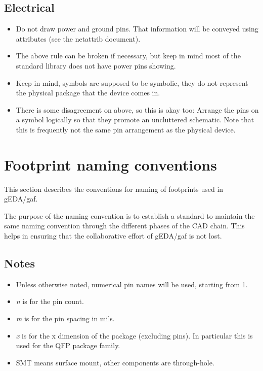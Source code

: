\documentclass{article}
\begin{document}
\subsection{Electrical}

\begin{itemize}
\item Do not draw power and ground pins.  That information will be
      conveyed using attributes (see the netattrib document).
\item The above rule can be broken if necessary, but keep in mind most of
      the standard library does not have power pins showing.
\item Keep in mind, symbols are supposed to be symbolic, they do not represent
      the physical package that the device comes in.  
\item There is some disagreement on above, so this is okay too: Arrange
      the pins on a symbol logically so that they promote an uncluttered
      schematic.  Note that this is frequently not the same pin
      arrangement as the physical device.
\end{itemize}

\section{Footprint naming conventions}

This section describes the conventions for naming of footprints used in
gEDA/gaf. 

The purpose of the naming convention is to establish a standard to
maintain the same naming convention through the different phases of the 
CAD chain. This helps in ensuring that the collaborative effort of gEDA/gaf 
is not lost.

\subsection{Notes}
\begin{itemize}
\item  Unless otherwise noted, numerical pin names will be used,
       starting from 1.
\item  {\it n} is for the pin count.
\item  {\it m} is for the pin spacing in mils.
\item  {\it x} is for the x dimension of the package (excluding
       pins).  In particular this is used for the QFP package family.

\item  SMT means surface mount, other components are through-hole.
\end{itemize}
\end{document}
